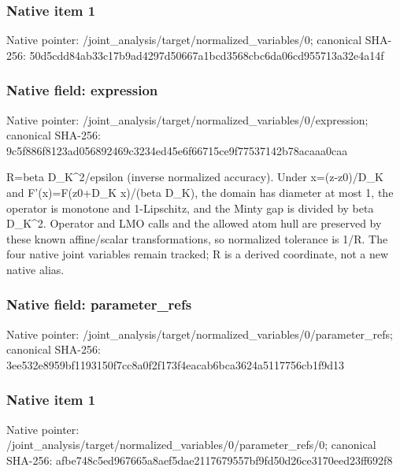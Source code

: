 \documentclass[10pt,a4paper]{article}
\begin{document}
\subsubsection{Native item 1}
Native pointer: /joint\_\allowbreak{}analysis/target/normalized\_\allowbreak{}variables/0; canonical SHA-256: 50d5cdd84ab33c17b9ad4297d50667a1bcd3568cbc6da06cd955713a32e4a14f

\subsubsection{Native field: expression}
Native pointer: /joint\_\allowbreak{}analysis/target/normalized\_\allowbreak{}variables/0/expression; canonical SHA-256: 9c5f886f8123ad056892469c3234ed45e6f66715ce9f77537142b78acaaa0caa

\begingroup\raggedright\sloppy R=\allowbreak{}beta D\_\allowbreak{}K\textasciicircum{}2/\allowbreak{}epsilon (inverse normalized accuracy). Under x=\allowbreak{}(z-z0)/\allowbreak{}D\_\allowbreak{}K and F'(x)=\allowbreak{}F(z0+D\_\allowbreak{}K x)/\allowbreak{}(beta D\_\allowbreak{}K),\allowbreak{} the domain has diameter at most 1,\allowbreak{} the operator is monotone and 1-Lipschitz,\allowbreak{} and the Minty gap is divided by beta D\_\allowbreak{}K\textasciicircum{}2. Operator and LMO calls and the allowed atom hull are preserved by these known affine/\allowbreak{}scalar transformations,\allowbreak{} so normalized tolerance is 1/\allowbreak{}R. The four native joint variables remain tracked;\allowbreak{} R is a derived coordinate,\allowbreak{} not a new native alias.\par\endgroup

\subsubsection{Native field: parameter\_\allowbreak{}refs}
Native pointer: /joint\_\allowbreak{}analysis/target/normalized\_\allowbreak{}variables/0/parameter\_\allowbreak{}refs; canonical SHA-256: 3ee532e8959bf1193150f7cc8a0f2f173f4eacab6bca3624a5117756cb1f9d13

\subsubsection{Native item 1}
Native pointer: /joint\_\allowbreak{}analysis/target/normalized\_\allowbreak{}variables/0/parameter\_\allowbreak{}refs/0; canonical SHA-256: afbe748c5ed967665a8aef5dae2117679557bf9fd50d26ce3170eed23ff692f8
\end{document}

